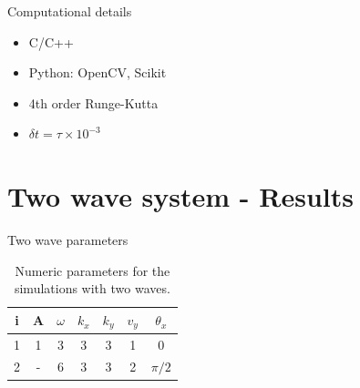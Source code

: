 \documentclass[10pt]{beamer}
\begin{document}
\begin{frame}{Computational details}


\begin{itemize}
    \item C/C++
    \item Python: OpenCV, Scikit
    \item 4th order Runge-Kutta
    \item $\delta t = \tau \times 10^{-3}$
\end{itemize}

\end{frame}

\section{Two wave system - Results}

\begin{frame}{Two wave parameters}

\begin{table}[h]
\centering
\begin{tabular}{c|c|c|c|c|c|c}
i & A & $\omega$  & $k_x$  & $k_y$  & $v_y$  & $\theta_x$\\
\hline 
1 & 1 & 3  & 3 &  3 &  1  & 0\\
2 & - & 6  & 3  & 3 &  2  & $\pi/2$\\ 

\end{tabular} 
\caption{Numeric parameters for the simulations with two waves.}
\label{param1}
\end{table}

\end{frame}
\end{document}
